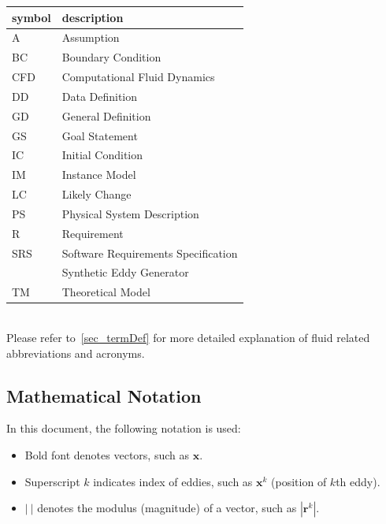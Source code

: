 \documentclass[12pt]{article}
\begin{document}
\renewcommand{\arraystretch}{1.2}
\begin{tabular}{l l} 
  \toprule		
  \textbf{symbol} & \textbf{description}\\
  \midrule 
  A & Assumption\\
  BC & Boundary Condition\\
  CFD & Computational Fluid Dynamics\\
  DD & Data Definition\\
  GD & General Definition\\
  GS & Goal Statement\\
  IC & Initial Condition\\
  IM & Instance Model\\
  LC & Likely Change\\
  PS & Physical System Description\\
  R & Requirement\\
  SRS & Software Requirements Specification\\
  \progname{} & Synthetic Eddy Generator\\
  TM & Theoretical Model\\
  \bottomrule
\end{tabular}\\

Please refer to~\ref{sec_termDef} for more detailed explanation of fluid related abbreviations and acronyms.

\subsection{Mathematical Notation}
In this document, the following notation is used:
\begin{itemize}
  \item Bold font denotes vectors, such as $\mathbf{x}$.
  \item Superscript $k$ indicates index of eddies, such as $\mathbf{x}^k$ (position of $k$th eddy).
  \item $|~|$ denotes the modulus (magnitude) of a vector, such as $|\mathbf{r}^k|$.
\end{itemize}

\end{document}
